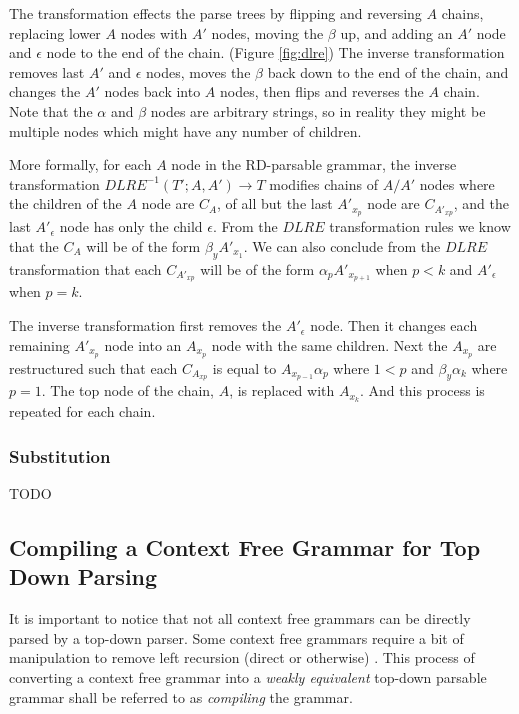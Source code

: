 \documentclass[11pt]{article}
\begin{document}
The transformation effects the parse trees by flipping and reversing $A$ chains,
replacing lower $A$ nodes with $A'$ nodes, moving the $\beta$ up,
and adding an $A'$ node and $\epsilon$ node to the end of the chain. (Figure \ref{fig:dlre}) The inverse transformation
removes last $A'$ and $\epsilon$ nodes, moves the $\beta$ back down to the end of the chain, and changes the $A'$ nodes back into
$A$ nodes, then flips and reverses the $A$ chain. Note that the $\alpha$ and $\beta$ nodes are arbitrary strings, so in reality
they might be multiple nodes which might have any number of children.

More formally, for each $A$ node in the RD-parsable grammar, the inverse transformation $DLRE^{-1}(T'; A, A') \rightarrow T$
modifies chains of $A/A'$ nodes where the children of the $A$ node are $C_A$, of all but the last $A'_{x_p}$ node are $C_{A'_{x p}}$,
and the last $A'_\epsilon$ node has only the child $\epsilon$.
From the $DLRE$ transformation rules we know that the $C_A$ will be of the form $\beta_y A'_{x_1}$. 
We can also conclude from the $DLRE$ transformation that each $C_{A'_{x p}}$ will be of the form $\alpha_p A'_{x_{p+1}}$
when $p < k$ and $A'_\epsilon$ when $p=k$. 

The inverse transformation first removes the $A'_\epsilon$ node. Then it changes each remaining $A'_{x_p}$ node into an $A_{x_p}$ node
with the same children. Next the $A_{x_p}$ are restructured such that each $C_{A_{x p}}$
is equal to $A_{x_{p-1}} \alpha_p$ where $1 < p$ and $\beta_y \alpha_k$ where $p=1$. The top node of the chain, 
$A$, is replaced with $A_{x_k}$. And this process is repeated for each chain.

\subsubsection{Substitution}

TODO

\clearpage

\subsection{Compiling a Context Free Grammar for Top Down Parsing}

It is important to notice that not all context free grammars can be directly parsed by a
top-down parser. Some context free grammars require a bit of manipulation to remove
left recursion (direct or otherwise) \cite{compiler}. This process of converting a context
free grammar into a {\em weakly equivalent} top-down parsable grammar shall be referred to as
{\em compiling} the grammar.
\end{document}
